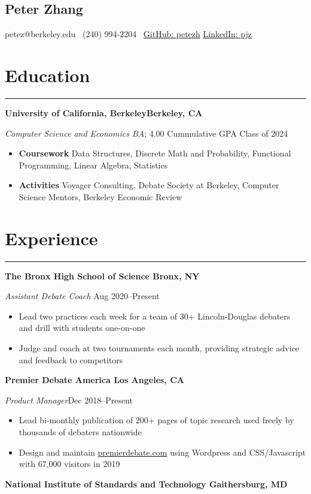 \documentclass[11pt]{article}
\newcommand{\name}[1]{\begin{center}\section*{\huge \color{highlight} #1}\end{center}}
\newcommand{\topinfo}[1]{\begin{center}\vspace{-0.2cm}#1\vspace{-0.2cm}\end{center}}
\newcommand{\resumesection}[1]{\vspace{-0.3cm}\section*{\color{highlight}#1}\vspace{-0.3cm}\hrule\vspace{0.3cm}}
\begin{document}
\name{Peter Zhang}
\topinfo{petez@berkeley.edu \textbullet\ (240) 994-2204 \textbullet\ \href{https://github.com/petezh}{GitHub: petezh} \textbullet \href{https://www.linkedin.com/in/pjz/}{LinkedIn: pjz}}

\resumesection{Education}

\textbf{University of California, Berkeley\hfill Berkeley, CA} \par
\textit{Computer Science and Economics BA}; 4.00 Cummulative GPA \hfill Class of 2024
\begin{itemize}
	\item \textbf{Coursework} Data Structures, Discrete Math and Probability, Functional Programming, Linear Algebra, Statistics
	\item \textbf{Activities} Voyager Consulting, Debate Society at Berkeley, Computer Science Mentors, Berkeley Economic Review
\end{itemize}

\resumesection{Experience}

\textbf{The Bronx High School of Science \hfill Bronx, NY} \par

\textit{Assistant Debate Coach} \hfill Aug 2020--Present
\begin{itemize}
	\item Lead two practices each week for a team of 30+ Lincoln-Douglas debaters and drill with students one-on-one
	\item Judge and coach at two tournaments each month, providing strategic advice and feedback to competitors
\end{itemize}\vspace{0.1cm}

\textbf{Premier Debate America \hfill Los Angeles, CA} \par

\textit{Product Manager}\hfill Dec 2018--Present
\begin{itemize}
	\item Lead bi-monthly publication of 200+ pages of topic research used freely by thousands of debaters nationwide
	\item Design and maintain \href{https://www.premierdebate.com/briefs/}{premierdebate.com} using Wordpress and CSS/Javascript with 67,000 visitors in 2019
\end{itemize}\vspace{0.1cm}

\textbf{National Institute of Standards and Technology \hfill Gaithersburg, MD}\par
\end{document}
